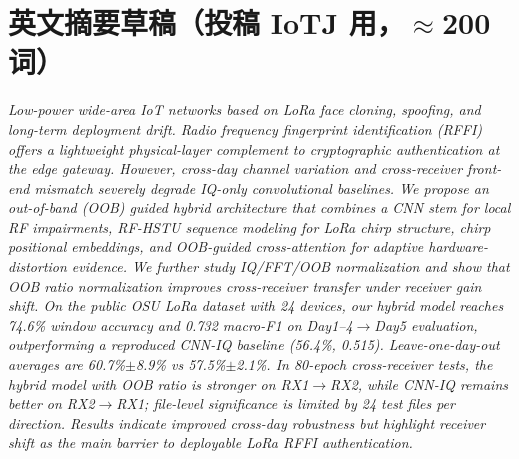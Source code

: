 \documentclass[journal]{IEEEtran}
\begin{document}
\section{英文摘要草稿（投稿 IoTJ 用，$\approx$200 词）}
\emph{Low-power wide-area IoT networks based on LoRa face cloning, spoofing, and long-term deployment drift. Radio frequency fingerprint identification (RFFI) offers a lightweight physical-layer complement to cryptographic authentication at the edge gateway. However, cross-day channel variation and cross-receiver front-end mismatch severely degrade IQ-only convolutional baselines. We propose an out-of-band (OOB) guided hybrid architecture that combines a CNN stem for local RF impairments, RF-HSTU sequence modeling for LoRa chirp structure, chirp positional embeddings, and OOB-guided cross-attention for adaptive hardware-distortion evidence. We further study IQ/FFT/OOB normalization and show that OOB ratio normalization improves cross-receiver transfer under receiver gain shift. On the public OSU LoRa dataset with 24 devices, our hybrid model reaches 74.6\% window accuracy and 0.732 macro-F1 on Day1--4$\rightarrow$Day5 evaluation, outperforming a reproduced CNN-IQ baseline (56.4\%, 0.515). Leave-one-day-out averages are 60.7\%$\pm$8.9\% vs 57.5\%$\pm$2.1\%. In 80-epoch cross-receiver tests, the hybrid model with OOB ratio is stronger on RX1$\rightarrow$RX2, while CNN-IQ remains better on RX2$\rightarrow$RX1; file-level significance is limited by 24 test files per direction. Results indicate improved cross-day robustness but highlight receiver shift as the main barrier to deployable LoRa RFFI authentication.}
\end{document}
